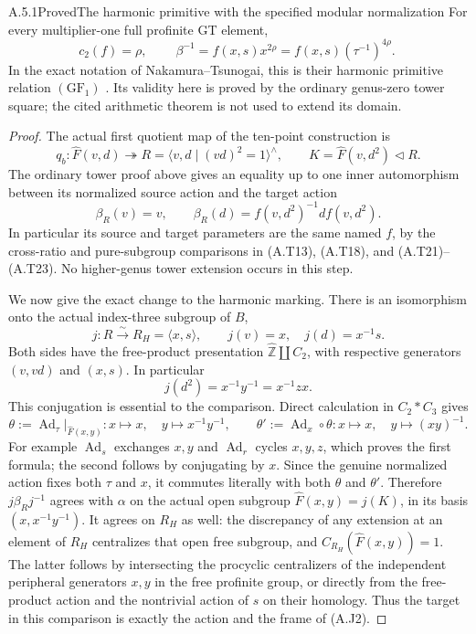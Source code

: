 \begin{result}{A.5.1}{Proved}{The harmonic primitive with the specified modular normalization}
For every multiplier-one full profinite GT element,
\[
 c_2(f)=\rho,\qquad
 \boxed{\ \beta^{-1}=f(x,s)x^{2\rho}
                      =f(x,s)(\tau^{-1})^{4\rho}.\ }
 \tag{A.J3}
\]
In the exact notation of Nakamura--Tsunogai, this is their
harmonic primitive relation $(\mathrm{GF}_1)$
\cite[Theorem 2, p.~199, and the comparison on p.~200]{CA_NT2002}.
Its validity here is proved by the ordinary genus-zero tower
square; the cited arithmetic theorem is not used to extend its
domain.
\end{result}
\begin{proof}
The actual first quotient map of the ten-point construction is
\[
 q_b:\widehat F(v,d)\twoheadrightarrow
 R=\langle v,d\mid(vd)^2=1\rangle^{\wedge},\qquad
 K=\widehat F(v,d^2)\triangleleft R.
 \tag{A.J4}
\]
The ordinary tower proof above gives an equality up to one
inner automorphism between its normalized source action and
the target action
\[
 \beta_R(v)=v,\qquad
 \beta_R(d)=f(v,d^2)^{-1}df(v,d^2).
 \tag{A.J5}
\]
In particular its source and target parameters are the same
named $f$, by the cross-ratio and pure-subgroup comparisons in
(A.T13), (A.T18), and (A.T21)--(A.T23).  No higher-genus tower
extension occurs in this step.

We now give the exact change to the harmonic marking.  There
is an isomorphism onto the actual index-three subgroup of $B$,
\[
 j:R\xrightarrow{\sim}R_H=\langle x,s\rangle,
 \qquad j(v)=x,\quad j(d)=x^{-1}s.
 \tag{A.J6}
\]
Both sides have the free-product presentation
$\widehat{\mathbb Z}\amalg C_2$, with respective generators
$(v,vd)$ and $(x,s)$.  In particular
\[
 j(d^2)=x^{-1}y^{-1}=x^{-1}zx.
 \tag{A.J7}
\]
This conjugation is essential to the comparison.  Direct
calculation in $C_2*C_3$ gives
\[
 \theta:=\operatorname{Ad}_{\tau}|_{\widehat F(x,y)}:
 x\mapsto x,\quad y\mapsto x^{-1}y^{-1},
 \qquad
 \theta':=\operatorname{Ad}_x\circ\theta:
 x\mapsto x,\quad y\mapsto (xy)^{-1}.
 \tag{A.J8}
\]
For example $\operatorname{Ad}_s$ exchanges $x,y$ and
$\operatorname{Ad}_r$ cycles $x,y,z$, which proves the first
formula; the second follows by conjugating by $x$.  Since the
genuine normalized action fixes both $\tau$ and $x$, it commutes
literally with both $\theta$ and $\theta'$.  Therefore
$j\beta_Rj^{-1}$ agrees with $\alpha$ on the actual open
subgroup $\widehat F(x,y)=j(K)$, in its basis
$(x,x^{-1}y^{-1})$.  It agrees on $R_H$ as well: the
discrepancy of any extension at an element of $R_H$ centralizes
that open free subgroup, and
$C_{R_H}(\widehat F(x,y))=1$.  The latter follows by intersecting
the procyclic centralizers of the independent peripheral
generators $x,y$ in the free profinite group, or directly from
the free-product action and the nontrivial action of $s$ on
their homology.  Thus the target in this comparison is exactly
the action and the frame of (A.J2).


\end{proof}
